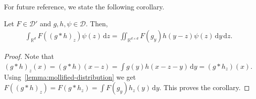 For future reference, we state the following corollary.
\begin{corollary}\label{cor:minosokoad}
    Let \(F \in \mathcal{D}'\) and \(g,h, \psi \in \mathcal{D}\). Then, 
    \begin{align*}
        \int_{\mathbb{R}^d} F({(g*h)}_z) \psi(z)\, \mathrm{d}z
    = \iint_{\mathbb{R}^{d \times d}} F(g_y)  h(y-z) \psi(z) \, \mathrm{d}y\, \mathrm{d}z.
    \end{align*}
\end{corollary}

\begin{proof}
    Note that \({(g*h)}_z(x) = (g*h)(x - z) = \int g(y)h(x-z-y) \, \mathrm{d}y = (g*h_z)(x)\). Using~\eqref{lemma:mollified-distribution} we get \(F({(g*h)}_z) = F(g*h_z) = \int F(g_y) h_z(y) \, \mathrm{d}y\). This proves the corollary.
\end{proof}
